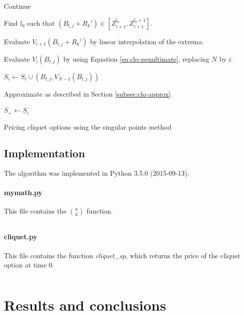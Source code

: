 \begin{algorithm}[H]
{{{				 {
					Continue 
				}
				
				Find $ l_0 $ such that $ ( B_{l,j} + R_k' ) \in [ Z_{i+1}^{l_0}, Z_{i+1}^{l_0 + 1} ] $. \;
				
				Evaluate $ V_{i+1} (B_{l,j} + R_k') $ by linear interpolation of the extrema. \;
				
				Evaluate $ V_{i}(B_{l,j}) $ by using Equation \ref{eq:clq-penultimate}, replacing $ N $ by $ i $. \;
				
				$ S_i \leftarrow S_i \cup (B_{l,j}, V_{N-1}(B_{l,j})) $ \;
			}
			
			Approximate as described in Section \ref{subsec:clq-approx}. \;
			
			$ S_+ \leftarrow S_i $ \;
		}
	}
	
	\caption{Pricing cliquet options using the singular points method}
\end{algorithm}


\clearpage
\subsection{Implementation}
The algorithm was implemented in Python 3.5.0 (2015-09-13).

\paragraph{mymath.py}
This file contains the $ \binom{n}{k} $ function.

\inputminted[tabsize=4]{python}{../code/mymath.py}
\label{lst:mymath}

\paragraph{cliquet.py}
This file contains the function \emph{cliquet\_sp}, which returns the price of the cliquet option at time 0.

\inputminted[tabsize=4]{python}{../code/cliquet.py}
\label{lst:clq}



\clearpage
\section{Results and conclusions}
\label{sec:clq-results}

